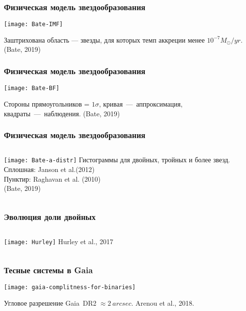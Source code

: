 \begin{frame}%
\frametitle{Физическая модель звездообразования}
\begin{center}
\texttt{[image: Bate-IMF]}
\end{center}
{\scriptsize Заштрихована область --- звезды, для которых темп аккреции менее $10^{-7}M_\odot/yr$. (Bate, 2019)}
\end{frame}

\begin{frame}%
\frametitle{Физическая модель звездообразования}
\begin{center}
\texttt{[image: Bate-BF]}
\end{center}
{\scriptsize Стороны прямоугольников = $1\sigma$, кривая~---~аппроксимация, квадраты~---~наблюдения. (Bate, 2019)}
\end{frame}

\begin{frame}%
\frametitle{Физическая модель звездообразования}
\begin{columns}
	\texttt{[image: Bate-a-distr]}
 {\scriptsize Гистограммы для двойных, тройных и более звезд.} \\
 {\scriptsize Сплошная: Janson et al.(2012)} \\
 {\scriptsize Пунктир: Raghavan et al. (2010)} \\
 {\scriptsize (Bate, 2019)}%
\end{columns}
\end{frame}

\begin{frame}
\frametitle{Эволюция доли двойных}
\begin{columns}
	\texttt{[image: Hurley]}
 {\footnotesize Hurley et al., 2017}%
\end{columns}
\end{frame}


\begin{frame}
\frametitle{Тесные системы в Gaia}
\begin{center}
\texttt{[image: gaia-complitness-for-binaries]}
\end{center}
{\footnotesize Угловое разрешение Gaia~DR2 $\approx 2~arcsec$. Arenou et al., 2018.}
\end{frame}

